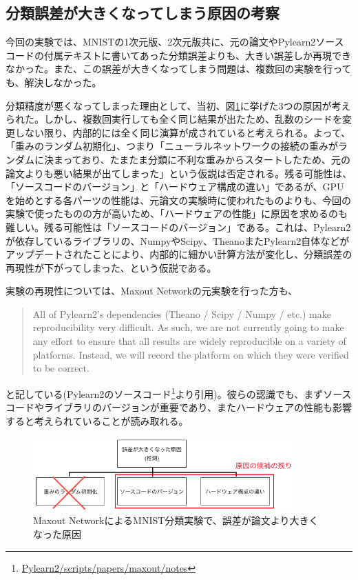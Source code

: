\subsection{分類誤差が大きくなってしまう原因の考察}
今回の実験では、MNISTの1次元版、2次元版共に、元の論文やPylearn2ソースコードの付属テキストに書いてあった分類誤差よりも、大きい誤差しか再現できなかった。また、この誤差が大きくなってしまう問題は、複数回の実験を行っても、解決しなかった。\par
分類精度が悪くなってしまった理由として、当初、図\ref{c6_maxout_cause}に挙げた3つの原因が考えられた。しかし、複数回実行しても全く同じ結果が出たため、乱数のシードを変更しない限り、内部的には全く同じ演算が成されていると考えられる。よって、「重みのランダム初期化」、つまり「ニューラルネットワークの接続の重みがランダムに決まっており、たまたま分類に不利な重みからスタートしたため、元の論文よりも悪い結果が出てしまった」という仮説は否定される。残る可能性は、「ソースコードのバージョン」と「ハードウェア構成の違い」であるが、GPUを始めとする各パーツの性能は、元論文の実験時に使われたものよりも、今回の実験で使ったものの方が高いため、「ハードウェアの性能」に原因を求めるのも難しい。残る可能性は「ソースコードのバージョン」である。これは、Pylearn2が依存しているライブラリの、NumpyやScipy、TheanoまたPylearn2自体などがアップデートされたことにより、内部的に細かい計算方法が変化し、分類誤差の再現性が下がってしまった、という仮説である。\par
実験の再現性については、Maxout Networkの元実験を行った方も、
\begin{quote}
All of Pylearn2's dependencies (Theano / Scipy / Numpy / etc.) make reproducibility
very difficult. As such, we are not currently going to make any effort to ensure that
all results are widely reproducible on a variety of platforms. Instead, we will
record the platform on which they were verified to be correct.
\end{quote}
と記している(Pylearn2のソースコード\footnote{\url{Pylearn2/scripts/papers/maxout/notes}}より引用)。彼らの認識でも、まずソースコードやライブラリのバージョンが重要であり、またハードウェアの性能も影響すると考えられていることが読み取れる。\par
\begin{figure}[tbp]
 \begin{center}
  \includegraphics[width=100mm]{img/c6/maxout_error_cause}
 \end{center}
 \caption{Maxout NetworkによるMNIST分類実験で、誤差が論文より大きくなった原因}
 \label{c6_maxout_cause}
\end{figure}
